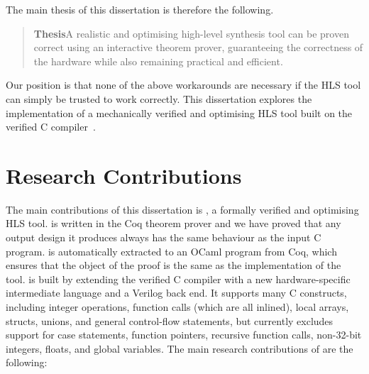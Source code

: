 The main thesis of this dissertation is therefore the following.

\begin{samepage}
  \begin{quote}
    \textbf{Thesis}\quad A realistic and optimising high-level synthesis tool
    can be proven correct using an interactive theorem prover, guaranteeing the
    correctness of the hardware while also remaining practical and efficient.
  \end{quote}
\end{samepage}

Our position is that none of the above workarounds are necessary if the
\gls{HLS} tool can simply be trusted to work correctly.  This dissertation
explores the implementation of a mechanically verified and optimising \gls{HLS}
tool built on the \compcert{} verified C
compiler~\cite{leroy06_formal_certif_compil_back_end,leroy09_formal_verif_realis_compil,leroy16_cfvoc}.



\section{Research Contributions}%
\label{sec:intro:research-contributions}

The main contributions of this dissertation is \vericert{}, a formally verified
and optimising \gls{HLS} tool.  \vericert{} is written in the Coq theorem prover
and we have proved that any output design it produces always has the same
behaviour as the input C program.  \vericert{} is automatically extracted to an
OCaml program from Coq, which ensures that the object of the proof is the same
as the implementation of the tool.  \vericert{} is built by extending the
\compcert{} verified C compiler with a new hardware-specific intermediate
language and a Verilog back end.  It supports many C constructs, including
integer operations, function calls (which are all inlined), local arrays,
structs, unions, and general control-flow statements, but currently excludes
support for case statements, function pointers, recursive function calls,
non-32-bit integers, floats, and global variables.  The main research
contributions of \vericert{} are the following:

